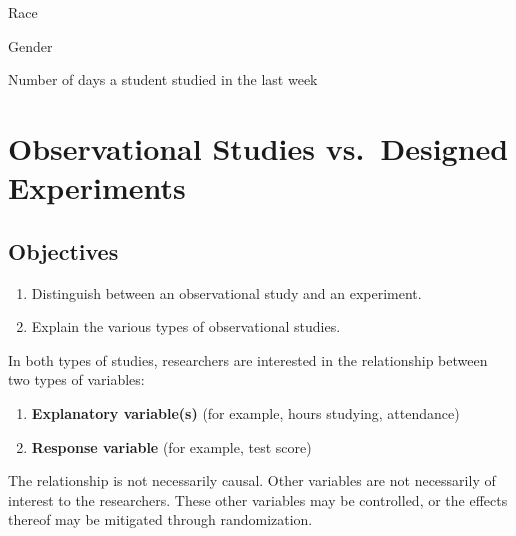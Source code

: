\documentclass{ximera}
\begin{document}
\begin{problem}
\begin{question}
Race
\begin{multipleChoice}
\end{multipleChoice}
\end{question}

\begin{question}
Gender
\begin{multipleChoice}
\end{multipleChoice}
\end{question}

\begin{question}
Number of days a student studied in the last week
\begin{multipleChoice}
\end{multipleChoice}
\end{question}
\end{problem}

\section{Observational Studies vs.\ Designed Experiments}

\subsection*{Objectives}
\begin{enumerate}
  \item Distinguish between an observational study and an experiment.
  \item Explain the various types of observational studies.
\end{enumerate}

In both types of studies, researchers are interested in the relationship between two types of variables:
\begin{enumerate}
  \item \textbf{Explanatory variable(s)} (for example, hours studying, attendance)
  \item \textbf{Response variable} (for example, test score)
\end{enumerate}
The relationship is not necessarily causal. Other variables are not necessarily of interest to the researchers. These other variables may be controlled, or the effects thereof may be mitigated through randomization.
\end{document}
